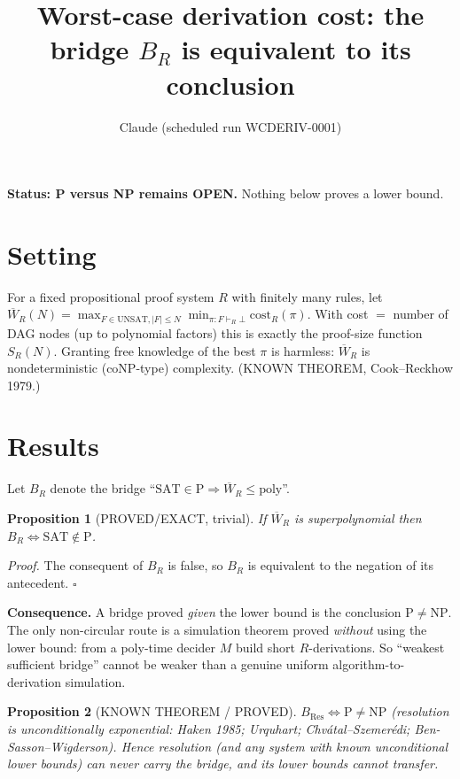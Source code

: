 \documentclass{article}
\newtheorem{prop}{Proposition}
\begin{document}
\title{Worst-case derivation cost: the bridge $B_R$ is equivalent to its conclusion}
\author{Claude (scheduled run WCDERIV-0001)}
\maketitle

\noindent\textbf{Status: P versus NP remains OPEN.} Nothing below proves a lower bound.

\section{Setting}
For a fixed propositional proof system $R$ with finitely many rules, let
$\overline W_R(N)=\max_{F\in\mathrm{UNSAT},|F|\le N}\min_{\pi:F\vdash_R\bot}\mathrm{cost}_R(\pi)$.
With cost $=$ number of DAG nodes (up to polynomial factors) this is exactly the proof-size function $S_R(N)$.
Granting free knowledge of the best $\pi$ is harmless: $\overline W_R$ is nondeterministic (coNP-type) complexity.
(KNOWN THEOREM, Cook--Reckhow 1979.)

\section{Results}
Let $B_R$ denote the bridge ``$\mathrm{SAT}\in\mathrm{P}\Rightarrow\overline W_R\le\mathrm{poly}$''.

\begin{prop}[PROVED/EXACT, trivial] If $\overline W_R$ is superpolynomial then $B_R\iff \mathrm{SAT}\notin\mathrm{P}$.
\end{prop}
\noindent\emph{Proof.} The consequent of $B_R$ is false, so $B_R$ is equivalent to the negation of its antecedent. $\square$

\textbf{Consequence.} A bridge proved \emph{given} the lower bound is the conclusion $\mathrm{P}\ne\mathrm{NP}$. The only non-circular route
is a simulation theorem proved \emph{without} using the lower bound: from a poly-time decider $M$ build short $R$-derivations.
So ``weakest sufficient bridge'' cannot be weaker than a genuine uniform algorithm-to-derivation simulation.

\begin{prop}[KNOWN THEOREM / PROVED] $B_{\mathrm{Res}}\iff \mathrm{P}\ne\mathrm{NP}$ (resolution is unconditionally exponential: Haken 1985; Urquhart; Chv\'atal--Szemer\'edi; Ben-Sasson--Wigderson). Hence resolution (and any system with known unconditional lower bounds) can never carry the bridge, and its lower bounds cannot transfer.
\end{prop}
\end{document}
